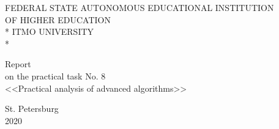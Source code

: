 \newpage
\begin{titlepage}

\begin{center}\large{
    FEDERAL STATE AUTONOMOUS EDUCATIONAL INSTITUTION \\
    OF HIGHER EDUCATION \\*
    ITMO UNIVERSITY \\*
}\end{center}

\vspace{12em}

\begin{center}\large{
    Report \\
    on the practical task No. 8 \\
    <<Practical analysis of advanced algorithms>>
}\end{center}

\vspace{8.5em}

\vspace{1.5em}

\vspace{\fill}

\begin{center}
    St. Petersburg \\
    2020
\end{center}

\end{titlepage}
